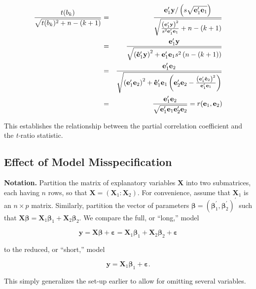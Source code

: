 \begin{center}
\begin{eqnarray*}
\frac{t(b_{k})}{\sqrt{t(b_{k})^{2}+n-(k+1)}} &=&\frac{\mathbf{e}%
_{1}^{\prime }\mathbf{y}/\left( s\sqrt{\mathbf{e}_{1}^{\prime }\mathbf{%
e}_{1}}\right) }{\sqrt{\frac{\left( \mathbf{e}_{1}^{\prime }%
\mathbf{y}\right) ^{2}}{s^{2}\mathbf{e}_{1}^{\prime }\mathbf{e}%
_{1}}+n-(k+1)}} \\
&=&\frac{\mathbf{e}_{1}^{\prime }\mathbf{y}}{\sqrt{\left( \mathbf{\hat{%
e}}_{1}^{\prime }\mathbf{y}\right) ^{2}+\mathbf{e}_{1}^{\prime }%
\mathbf{e}_{1}s^{2}\left( n-(k+1)\right) }} \\
&=&\frac{\mathbf{e}_{1}^{\prime }\mathbf{e}_{2}}{\sqrt{\left(
\mathbf{e}_{1}^{\prime }\mathbf{e}_{2}\right) ^{2}+\mathbf{\hat{e%
}}_{1}^{\prime }\mathbf{e}_{1}\left( \mathbf{e}_{2}^{\prime }%
\mathbf{e}_{2}-\frac{\left( \mathbf{e}_{1}^{\prime }\mathbf{\hat{%
e}}_{2}\right) ^{2}}{\mathbf{e}_{1}^{\prime }\mathbf{e}_{1}}%
\right) }} \\
&=&\frac{\mathbf{e}_{1}^{\prime }\mathbf{e}_{2}}{\sqrt{\mathbf{%
e}_{1}^{\prime }\mathbf{e}_{1}\mathbf{e}_{2}^{\prime }%
\mathbf{e}_{2}}}=r(\mathbf{e}_{1},\mathbf{e}_{2})
\end{eqnarray*}
\end{center}
This establishes the relationship between the partial correlation
coefficient and the \textit{t-}ratio statistic.

\subsection{Effect of Model Misspecification}

\textbf{Notation.} Partition the matrix of explanatory variables $\mathbf{X}$
into two submatrices, each having $n$ rows, so that $\mathbf{X}=(\mathbf{X}%
_{1} : \mathbf{X}_{2})$. For convenience, assume that $\mathbf{X}_{1}$ is an $%
n\times p$ matrix. Similarly, partition the vector of parameters
$\boldsymbol \beta =\left( \boldsymbol \beta _{1}^{\prime },
\boldsymbol \beta _{2}^{\prime }\right) ^{\prime }$ such that
$\mathbf{X \boldsymbol \beta }=\mathbf{X}_{1} \boldsymbol \beta_{1}+
\mathbf{X}_{2} \boldsymbol \beta_{2}$. We compare the full, or
``long,'' model
\begin{center}
\[
\mathbf{y}=\mathbf{X \boldsymbol \beta }+\boldsymbol \varepsilon = \mathbf{X}_{1} \boldsymbol \beta_{1}+%
\mathbf{X}_{2} \boldsymbol \beta_{2}+\boldsymbol \varepsilon
\]
\end{center}
to the reduced, or ``short,'' model
\begin{center}
\[
\mathbf{y}=\mathbf{X}_{1} \boldsymbol \beta_{1}+\boldsymbol
\varepsilon.
\]
\end{center}
This simply generalizes the set-up earlier to allow for omitting
several variables.

